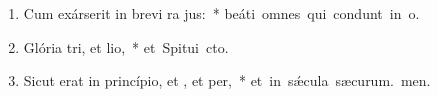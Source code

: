 \begin{flushleft}
\begin{enumerate}[leftmargin=*]
\item Cum exárserit in brevi ra jus:~* \mbox{beáti omnes qui condunt in o.}

\item Glória tri, et lio,~* \mbox{et Spitui cto.}

\item Sicut erat in princípio, et , et per,~* \mbox{et in s\'{\ae}cula sæcurum. men.}

\end{enumerate}
\end{flushleft}

